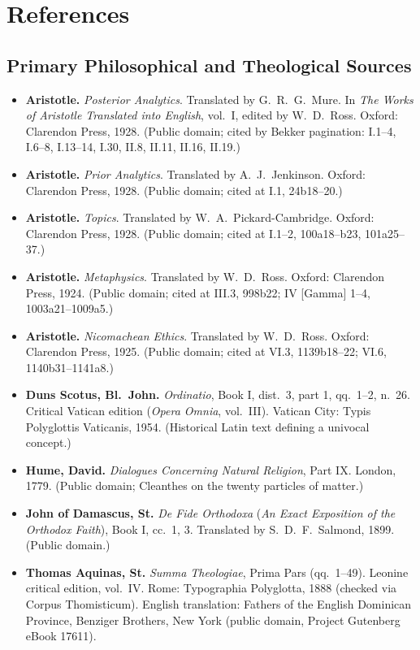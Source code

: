 \section{References}

\subsection*{Primary Philosophical and Theological Sources}

\begin{itemize}
\item \textbf{Aristotle.} \emph{Posterior Analytics}. Translated by G.\ R.\ G.\ Mure. In \emph{The Works of Aristotle Translated into English}, vol.\ I, edited by W.\ D.\ Ross. Oxford: Clarendon Press, 1928. (Public domain; cited by Bekker pagination: I.1--4, I.6--8, I.13--14, I.30, II.8, II.11, II.16, II.19.)
\item \textbf{Aristotle.} \emph{Prior Analytics}. Translated by A.\ J.\ Jenkinson. Oxford: Clarendon Press, 1928. (Public domain; cited at I.1, 24b18--20.)
\item \textbf{Aristotle.} \emph{Topics}. Translated by W.\ A.\ Pickard-Cambridge. Oxford: Clarendon Press, 1928. (Public domain; cited at I.1--2, 100a18--b23, 101a25--37.)
\item \textbf{Aristotle.} \emph{Metaphysics}. Translated by W.\ D.\ Ross. Oxford: Clarendon Press, 1924. (Public domain; cited at III.3, 998b22; IV [Gamma] 1--4, 1003a21--1009a5.)
\item \textbf{Aristotle.} \emph{Nicomachean Ethics}. Translated by W.\ D.\ Ross. Oxford: Clarendon Press, 1925. (Public domain; cited at VI.3, 1139b18--22; VI.6, 1140b31--1141a8.)
\item \textbf{Duns Scotus, Bl.\ John.} \emph{Ordinatio}, Book I, dist.\ 3, part 1, qq.\ 1--2, n.\ 26. Critical Vatican edition (\emph{Opera Omnia}, vol.\ III). Vatican City: Typis Polyglottis Vaticanis, 1954. (Historical Latin text defining a univocal concept.)
\item \textbf{Hume, David.} \emph{Dialogues Concerning Natural Religion}, Part IX. London, 1779. (Public domain; Cleanthes on the twenty particles of matter.)
\item \textbf{John of Damascus, St.} \emph{De Fide Orthodoxa} (\emph{An Exact Exposition of the Orthodox Faith}), Book I, cc.\ 1, 3. Translated by S.\ D.\ F.\ Salmond, 1899. (Public domain.)
\item \textbf{Thomas Aquinas, St.} \emph{Summa Theologiae}, Prima Pars (qq.\ 1--49). Leonine critical edition, vol.\ IV. Rome: Typographia Polyglotta, 1888 (checked via Corpus Thomisticum). English translation: Fathers of the English Dominican Province, Benziger Brothers, New York (public domain, Project Gutenberg eBook 17611).

\end{itemize}
